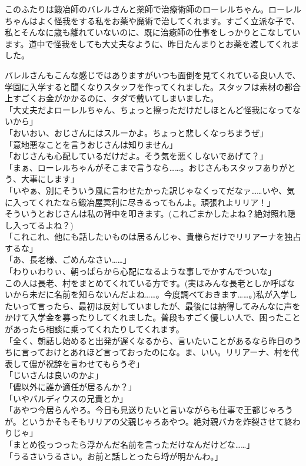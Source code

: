 \documentclass[oneside, a4paper]{jsbook}
\begin{document}
このふたりは鍛冶師のバレルさんと薬師で治療術師のローレルちゃん。ローレルちゃんはよく怪我をする私をお薬や魔術で治してくれます。すごく立派な子で、私とそんなに歳も離れていないのに、既に治癒師の仕事をしっかりとこなしています。道中で怪我をしても大丈夫なように、昨日たんまりとお薬を渡してくれました。

バレルさんもこんな感じではありますがいつも面倒を見てくれている良い人で、学園に入学すると聞くなりスタッフを作ってくれました。スタッフは素材の都合上すごくお金がかかるのに、タダで戴いてしまいました。\\

\noindent
「大丈夫だよローレルちゃん、ちょっと擦っただけだしほとんど怪我になってないから」\\
「おいおい、おじさんにはスルーかよ。ちょっと悲しくなっちまうぜ」\\
「意地悪なことを言うおじさんは知りません」\\
「おじさんも心配しているだけだよ。そう気を悪くしないであげて？」\\
「まぁ、ローレルちゃんがそこまで言うなら……。おじさんもスタッフありがとう、大事にします」\\
「いやぁ、別にそういう風に言わせたかった訳じゃなくってだなァ……いや、気に入ってくれたなら鍛冶屋冥利に尽きるってもんよ。頑張れよリリア！」\\

そういうとおじさんは私の背中を叩きます。(これごまかしたよね？絶対照れ隠し入ってるよね？)\\

\noindent
「これこれ、他にも話したいものは居るんじゃ、貴様らだけでリリアーナを独占するな」\\
「あ、長老様、ごめんなさい……」\\
「わりぃわりぃ、朝っぱらから心配になるような事しでかすんでついな」\\

この人は長老、村をまとめてくれている方です。(実はみんな長老としか呼ばないから未だに名前を知らないんだよね……。今度調べておきます……。)私が入学したいって言ったら、最初は反対していましたが、最後には納得してみんなに声をかけて入学金を募ったりしてくれました。普段もすごく優しい人で、困ったことがあったら相談に乗ってくれたりしてくれます。\\

\noindent
「全く、朝話し始めると出発が遅くなるから、言いたいことがあるなら昨日のうちに言っておけとあれほど言っておったのにな。ま、いい。リリアーナ、村を代表して儂が祝辞を言わせてもらうぞ」\\
「じいさんは良いのかよ」\\
「儂以外に誰か適任が居るんか？」\\
「いやバルディウスの兄貴とか」\\
「あやつ今居らんやろ。今日も見送りたいと言いながらも仕事で王都じゃろうが。というかそもそもリリアの父親じゃろあやつ。絶対親バカを炸裂させて終わりじゃ」\\
「まとめ役っつったら浮かんだ名前を言っただけなんだけどな……」\\
「うるさいうるさい。お前と話しとったら埒が明かんわ。」\\
\end{document}
